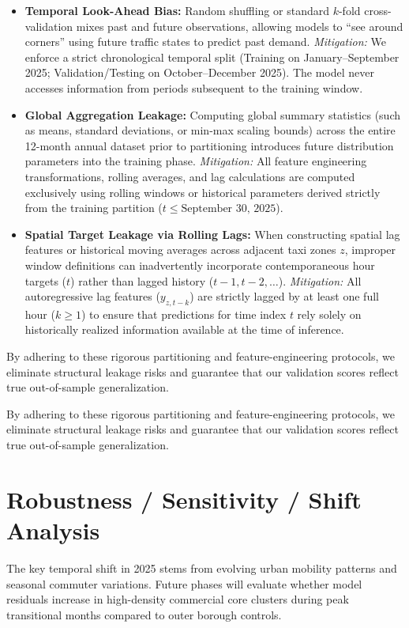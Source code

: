\documentclass[11pt,a4paper]{article}
\begin{document}
\begin{itemize}
    \item \textbf{Temporal Look-Ahead Bias:} 
    Random shuffling or standard $k$-fold cross-validation mixes past and future observations, allowing models to ``see around corners'' using future traffic states to predict past demand. \textit{Mitigation:} We enforce a strict chronological temporal split (Training on January–September 2025; Validation/Testing on October–December 2025). The model never accesses information from periods subsequent to the training window.
    
    \item \textbf{Global Aggregation Leakage:} 
    Computing global summary statistics (such as means, standard deviations, or min-max scaling bounds) across the entire 12-month annual dataset prior to partitioning introduces future distribution parameters into the training phase. \textit{Mitigation:} All feature engineering transformations, rolling averages, and lag calculations are computed exclusively using rolling windows or historical parameters derived strictly from the training partition ($t \le \text{September 30, 2025}$).
    
    \item \textbf{Spatial Target Leakage via Rolling Lags:} 
    When constructing spatial lag features or historical moving averages across adjacent taxi zones $z$, improper window definitions can inadvertently incorporate contemporaneous hour targets ($t$) rather than lagged history ($t-1, t-2, \dots$). \textit{Mitigation:} All autoregressive lag features ($y_{z, t-k}$) are strictly lagged by at least one full hour ($k \ge 1$) to ensure that predictions for time index $t$ rely solely on historically realized information available at the time of inference.
\end{itemize}

By adhering to these rigorous partitioning and feature-engineering protocols, we eliminate structural leakage risks and guarantee that our validation scores reflect true out-of-sample generalization.

By adhering to these rigorous partitioning and feature-engineering protocols, we eliminate structural leakage risks and guarantee that our validation scores reflect true out-of-sample generalization.

\section{Robustness / Sensitivity / Shift Analysis}
The key temporal shift in 2025 stems from evolving urban mobility patterns and seasonal commuter variations. Future phases will evaluate whether model residuals increase in high-density commercial core clusters during peak transitional months compared to outer borough controls.
\end{document}
